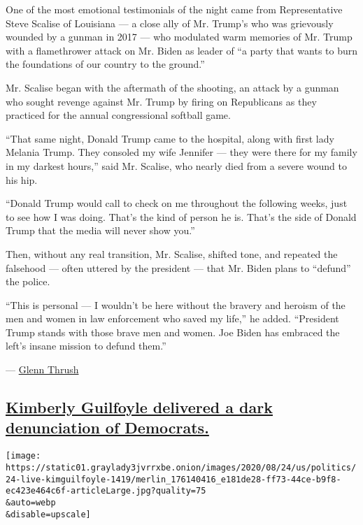 One of the most emotional testimonials of the night came from
Representative Steve Scalise of Louisiana --- a close ally of Mr.
Trump's who was grievously wounded by a gunman in 2017 --- who modulated
warm memories of Mr. Trump with a flamethrower attack on Mr. Biden as
leader of ``a party that wants to burn the foundations of our country to
the ground.''

Mr. Scalise began with the aftermath of the shooting, an attack by a
gunman who sought revenge against Mr. Trump by firing on Republicans as
they practiced for the annual congressional softball game.

``That same night, Donald Trump came to the hospital, along with first
lady Melania Trump. They consoled my wife Jennifer --- they were there
for my family in my darkest hours,'' said Mr. Scalise, who nearly died
from a severe wound to his hip.

``Donald Trump would call to check on me throughout the following weeks,
just to see how I was doing. That's the kind of person he is. That's the
side of Donald Trump that the media will never show you.''

Then, without any real transition, Mr. Scalise, shifted tone, and
repeated the falsehood --- often uttered by the president --- that Mr.
Biden plans to ``defund'' the police.

``This is personal --- I wouldn't be here without the bravery and
heroism of the men and women in law enforcement who saved my life,'' he
added. ``President Trump stands with those brave men and women. Joe
Biden has embraced the left's insane mission to defund them.''

--- \href{https://www.nytimes3xbfgragh.onion/by/glenn-thrush}{Glenn
Thrush}

\hypertarget{kimberly-guilfoyle-delivered-a-dark-denunciation-of-democrats}{%
\subsection{\texorpdfstring{\protect\hyperlink{kimberly-guilfoyle-delivered-a-dark-denunciation-of-democrats}{Kimberly
Guilfoyle delivered a dark denunciation of
Democrats.}}{Kimberly Guilfoyle delivered a dark denunciation of Democrats.}}\label{kimberly-guilfoyle-delivered-a-dark-denunciation-of-democrats}}

\texttt{[image: https://static01.graylady3jvrrxbe.onion/images/2020/08/24/us/politics/24-live-kimguilfoyle-1419/merlin\_176140416\_e181de28-ff73-44ce-b9f8-ec423e464c6f-articleLarge.jpg?quality=75\\\&auto=webp\\\&disable=upscale]}

